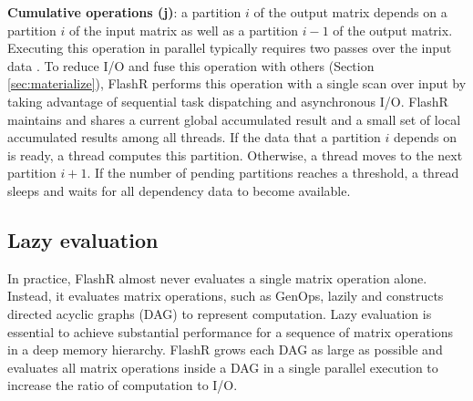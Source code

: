 \noindent \textbf{Cumulative operations (j)}:
		a partition $i$ of the output matrix depends on a partition $i$ of
		the input matrix as well as a partition $i-1$ of the output matrix.
		Executing this operation in parallel typically requires two passes over
		the input data \cite{Ladner1980}. To reduce I/O and fuse this operation
                with others (Section \ref{sec:materialize}), FlashR performs
		this operation with a single scan over input by taking advantage
                of sequential task dispatching and asynchronous I/O. FlashR maintains
		and shares a current global accumulated result and a small set of local
                accumulated results among all threads. If the data that a partition $i$
                depends on is ready, a thread computes this partition. Otherwise,
                a thread moves to the next partition $i+1$. If the number
		of pending partitions reaches a threshold, a thread sleeps
		and waits for all dependency data to become available.




\subsection{Lazy evaluation}\label{sec:lazyeval}

In practice, FlashR almost never evaluates a single matrix operation alone.
Instead, it evaluates matrix operations, such as GenOps,
lazily and constructs directed acyclic graphs (DAG) to represent computation.
Lazy evaluation is essential to achieve substantial performance for a sequence
of matrix operations in a deep memory hierarchy. FlashR grows each DAG as large
as possible and evaluates all matrix operations inside a DAG
in a single parallel execution to increase the ratio of computation to I/O.

